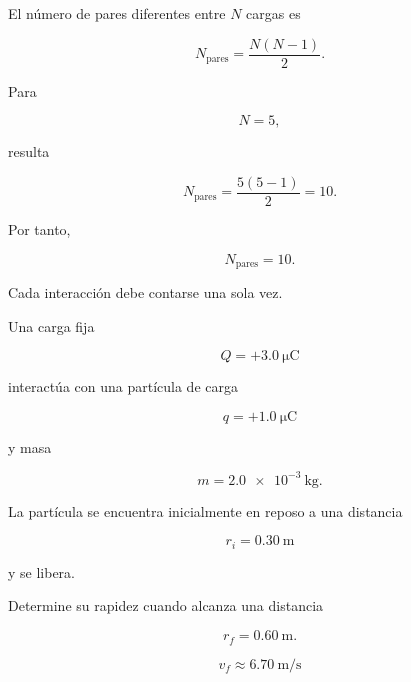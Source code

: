 \begin{explicacion}

El número de pares diferentes entre \(N\) cargas es

\[
N_{\text{pares}}
=
\frac{N(N-1)}{2}.
\]

Para

\[
N=5,
\]

resulta

\[
N_{\text{pares}}
=
\frac{5(5-1)}{2}
=
10.
\]

Por tanto,

\[
\boxed{N_{\text{pares}}=10}.
\]

Cada interacción debe contarse una sola vez.

\end{explicacion}


\begin{ejercicio}

Una carga fija

\[
Q=+\SI{3.0}{\micro\coulomb}
\]

interactúa con una partícula de carga

\[
q=+\SI{1.0}{\micro\coulomb}
\]

y masa

\[
m=\SI{2.0e-3}{\kilogram}.
\]

La partícula se encuentra inicialmente en reposo a una distancia

\[
r_i=\SI{0.30}{\metre}
\]

y se libera.

Determine su rapidez cuando alcanza una distancia

\[
r_f=\SI{0.60}{\metre}.
\]

\end{ejercicio}

\begin{respuesta}

\[
\boxed{v_f\approx\SI{6.70}{\metre\per\second}}
\]

\end{respuesta}

